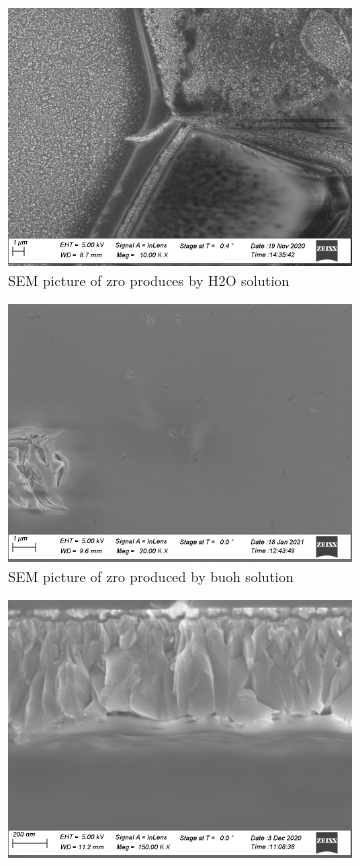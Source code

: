 \begin{figure}[htb]
    \centering
    \begin{subfigure}{.45\textwidth}
        \centering
        \includegraphics[width=.79\textwidth]{Pics/sem/071_fto_old_1x1F.png}
        \caption{SEM picture of \gls{zro} produces by H2O solution} \label{fig:sem-old}
    \end{subfigure}
    \begin{subfigure}{.45\textwidth}
        \centering
        \includegraphics[width=.79\textwidth]{Pics/sem/147_steel_ph_10x.png}
        \caption{SEM picture of \gls{zro} produced by buoh solution} \label{fig:sem-ph}
    \end{subfigure}
    \begin{subfigure}{.45\textwidth}
        \centering
        \includegraphics[width=.8\textwidth]{Pics/sem/115_fto_cs_1x.png}

\end{subfigure}
\end{figure}
